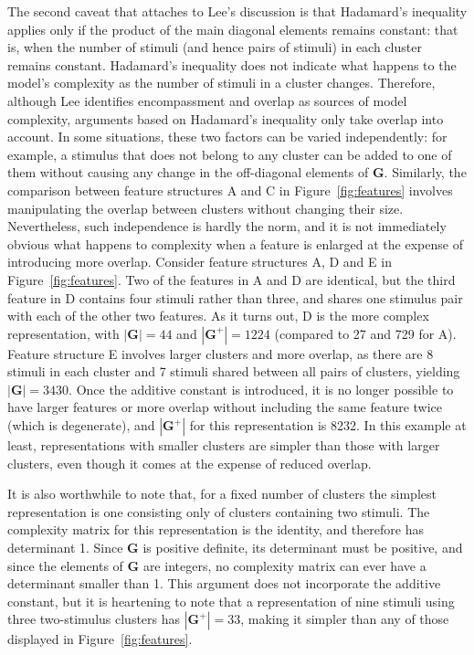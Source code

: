 \documentclass[doc,floatsintext]{apa6}
\newcommand{\mat}[1]{\mathbf{#1}}
\begin{document}
The second caveat that attaches to Lee's discussion is that Hadamard's inequality applies only if the product of the main diagonal elements remains constant: that is, when the number of stimuli (and hence pairs of stimuli) in each cluster remains constant. Hadamard's inequality does not indicate what happens to the model's complexity as the number of stimuli in a cluster changes. Therefore, although Lee identifies encompassment and overlap as sources of model complexity, arguments based on Hadamard's inequality only take overlap into account. In some situations, these two factors can be varied independently: for example, a stimulus that does not belong to any cluster can be added to one of them without causing any change in the off-diagonal elements of $\mat{G}$. Similarly, the comparison between feature structures A and C in Figure~\ref{fig:features} involves manipulating the overlap between clusters without changing their size. Nevertheless, such independence is hardly the norm, and it is not immediately obvious what happens to complexity when a feature is enlarged at the expense of introducing more overlap. Consider feature structures A, D and E in Figure~\ref{fig:features}. Two of the features in A and D are identical, but the third feature in D contains four stimuli rather than three, and shares  one stimulus pair with each of the other two features. As it turns out, D is the more complex representation, with $|\mat{G}|=44$ and $|\mat{G^{+}}|=1224$ (compared to 27 and 729 for A). Feature structure E involves larger clusters and more overlap, as there are 8 stimuli in each cluster and 7 stimuli shared between all pairs of clusters, yielding $|\mat{G}|=3430$. Once the additive constant is introduced, it is no longer possible to have larger features or more overlap without including the same feature twice (which is degenerate), and $|\mat{G^{+}}|$ for this representation is 8232. In this example at least, representations with smaller clusters are simpler than those with larger clusters, even though it comes at the expense of reduced overlap.

It is also worthwhile to note that, for a fixed number of clusters the simplest representation is one consisting only of clusters containing two stimuli. The complexity matrix for this representation is the identity, and therefore has determinant 1. Since $\mat{G}$ is positive definite, its determinant must be positive, and since the elements of $\mat{G}$ are integers, no complexity matrix can ever have a determinant smaller than 1. This argument does not incorporate the additive constant, but it is heartening to note that a representation of nine stimuli using three two-stimulus clusters has $|\mat{G^{+}}|=33$, making it simpler than any of those displayed in Figure~\ref{fig:features}.
\end{document}
